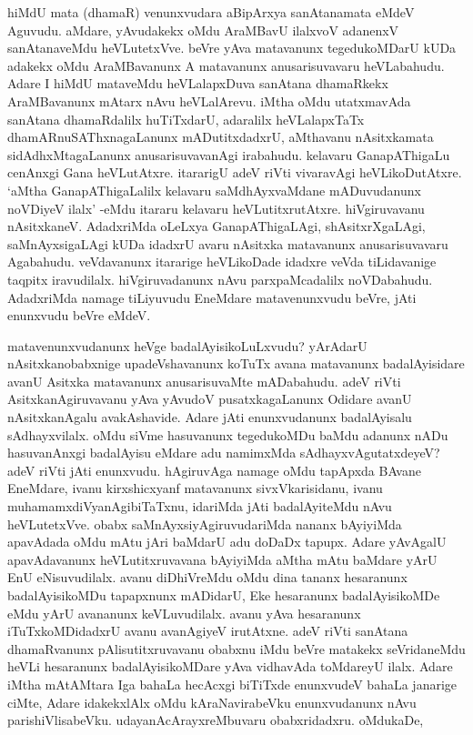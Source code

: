 hiMdU mata (dhamaR) venunxvudara aBipArxya sanAtanamata eMdeV Aguvudu. aMdare, yAvudakekx oMdu AraMBavU ilalxvoV adanenxV sanAtanaveMdu heVLutetxVve. beVre yAva matavanunx tegedukoMDarU kUDa adakekx oMdu AraMBavanunx A matavanunx anusarisuvavaru heVLabahudu. Adare I hiMdU mataveMdu heVLalapxDuva sanAtana dhamaRkekx AraMBavanunx mAtarx nAvu heVLalArevu. iMtha oMdu utatxmavAda sanAtana dhamaRdalilx huTiTxdarU, adaralilx heVLalapxTaTx dhamARnuSAThxnagaLanunx mADutitxdadxrU, aMthavanu nAsitxkamata sidAdhxMtagaLanunx anusarisuvavanAgi irabahudu. kelavaru GanapAThigaLu cenAnxgi Gana heVLutAtxre. itararigU adeV riVti vivaravAgi heVLikoDutAtxre. `aMtha GanapAThigaLalilx kelavaru saMdhAyxvaMdane mADuvudanunx noVDiyeV ilalx' -eMdu itararu kelavaru heVLutitxrutAtxre. hiVgiruvavanu nAsitxkaneV. AdadxriMda oLeLxya GanapAThigaLAgi, shAsitxrXgaLAgi, saMnAyxsigaLAgi kUDa idadxrU avaru nAsitxka matavanunx anusarisuvavaru Agabahudu. veVdavanunx itararige heVLikoDade idadxre veVda tiLidavanige taqpitx iravudilalx. hiVgiruvadanunx nAvu parxpaMcadalilx noVDabahudu. AdadxriMda namage tiLiyuvudu EneMdare matavenunxvudu beVre, jAti enunxvudu beVre eMdeV.

matavenunxvudanunx heVge badalAyisikoLuLxvudu? yArAdarU nAsitxkanobabxnige upadeVshavanunx koTuTx avana matavanunx badalAyisidare avanU Asitxka matavanunx anusarisuvaMte mADabahudu. adeV riVti AsitxkanAgiruvavanu yAva yAvudoV pusatxkagaLanunx Odidare avanU nAsitxkanAgalu avakAshavide. Adare jAti enunxvudanunx badalAyisalu sAdhayxvilalx. oMdu siVme hasuvanunx tegedukoMDu baMdu adanunx nADu hasuvanAnxgi badalAyisu eMdare adu namimxMda sAdhayxvAgutatxdeyeV? adeV riVti jAti enunxvudu. hAgiruvAga namage oMdu tapApxda BAvane EneMdare, ivanu kirxshicxyanf matavanunx sivxVkarisidanu, ivanu muhamamxdiVyanAgibiTaTxnu, idariMda jAti badalAyiteMdu nAvu heVLutetxVve. obabx saMnAyxsiyAgiruvudariMda nananx bAyiyiMda apavAdada oMdu mAtu jAri baMdarU adu doDaDx tapupx. Adare yAvAgalU apavAdavanunx heVLutitxruvavana bAyiyiMda aMtha mAtu baMdare yArU EnU eNisuvudilalx. avanu diDhiVreMdu oMdu dina tananx hesaranunx badalAyisikoMDu tapapxnunx mADidarU, Eke hesaranunx badalAyisikoMDe eMdu yArU avananunx keVLuvudilalx. avanu yAva hesaranunx iTuTxkoMDidadxrU avanu avanAgiyeV irutAtxne. adeV riVti sanAtana dhamaRvanunx pAlisutitxruvavanu obabxnu iMdu beVre matakekx seVridaneMdu heVLi hesaranunx badalAyisikoMDare yAva vidhavAda toMdareyU ilalx. Adare iMtha mAtAMtara Iga bahaLa hecAcxgi biTiTxde enunxvudeV bahaLa janarige ciMte, Adare idakekxlAlx oMdu kAraNavirabeVku enunxvudanunx nAvu parishiVlisabeVku. udayanAcArayxreMbuvaru obabxridadxru. oMdukaDe,


